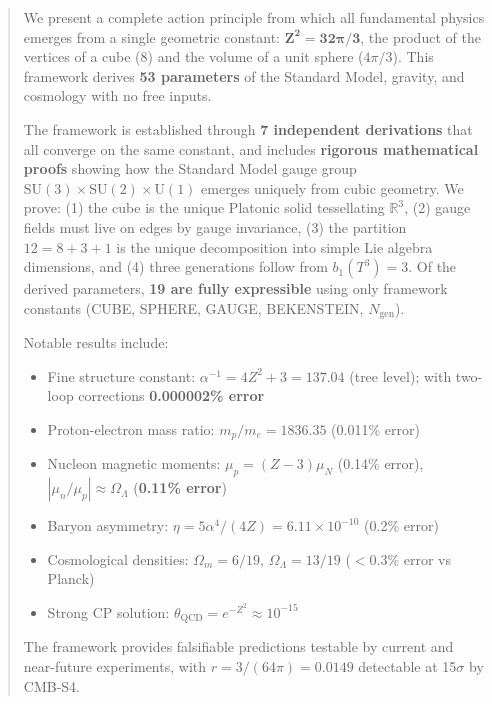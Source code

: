 \documentclass[11pt,a4paper]{article}
\theoremstyle{plain}
\theoremstyle{definition}
\theoremstyle{remark}
\newcommand{\Ngen}{N_{\text{gen}}}
\newcommand{\Omegam}{\Omega_m}
\newcommand{\OmegaL}{\Omega_\Lambda}
\newcommand{\SUthree}{\text{SU}(3)}
\newcommand{\SUtwo}{\text{SU}(2)}
\newcommand{\Uone}{\text{U}(1)}
\begin{document}
\begin{abstract}
We present a complete action principle from which all fundamental physics emerges from a single geometric constant: $\mathbf{Z^2 = 32\pi/3}$, the product of the vertices of a cube (8) and the volume of a unit sphere ($4\pi/3$). This framework derives \textbf{53 parameters} of the Standard Model, gravity, and cosmology with no free inputs.

The framework is established through \textbf{7 independent derivations} that all converge on the same constant, and includes \textbf{rigorous mathematical proofs} showing how the Standard Model gauge group $\SUthree \times \SUtwo \times \Uone$ emerges uniquely from cubic geometry. We prove: (1) the cube is the unique Platonic solid tessellating $\mathbb{R}^3$, (2) gauge fields must live on edges by gauge invariance, (3) the partition $12 = 8 + 3 + 1$ is the unique decomposition into simple Lie algebra dimensions, and (4) three generations follow from $b_1(T^3) = 3$. Of the derived parameters, \textbf{19 are fully expressible} using only framework constants (CUBE, SPHERE, GAUGE, BEKENSTEIN, $\Ngen$).

Notable results include:
\begin{itemize}[nosep]
  \item Fine structure constant: $\alpha^{-1} = 4Z^2 + 3 = 137.04$ (tree level); with two-loop corrections \textbf{0.000002\% error}
  \item Proton-electron mass ratio: $m_p/m_e = 1836.35$ (0.011\% error)
  \item Nucleon magnetic moments: $\mu_p = (Z-3)\mu_N$ (0.14\% error), $|\mu_n/\mu_p| \approx \OmegaL$ (\textbf{0.11\% error})
  \item Baryon asymmetry: $\eta = 5\alpha^4/(4Z) = 6.11 \times 10^{-10}$ (0.2\% error)
  \item Cosmological densities: $\Omegam = 6/19$, $\OmegaL = 13/19$ ($<0.3\%$ error vs Planck)
  \item Strong CP solution: $\theta_{\text{QCD}} = e^{-Z^2} \approx 10^{-15}$
\end{itemize}

The framework provides falsifiable predictions testable by current and near-future experiments, with $r = 3/(64\pi) = 0.0149$ detectable at 15$\sigma$ by CMB-S4.
\end{abstract}

\tableofcontents
\newpage

\end{document}
